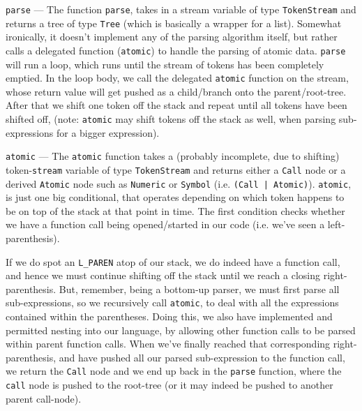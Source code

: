 \documentclass{article}
\newcommand{\code}[1]{\texttt{#1}}
\begin{document}
      \code{parse} --- The function \code{parse}, takes in a stream variable of
      type \code{TokenStream} and returns a tree of type \code{Tree} (which is
      basically a wrapper for a list).  Somewhat ironically, it doesn't implement
      any of the parsing algorithm itself, but rather calls a delegated
      function (\code{atomic}) to handle the parsing of atomic data. \code{parse}
      will run a loop, which runs until the stream of tokens has been completely
      emptied. In the loop body, we call the delegated \code{atomic} function on
      the stream, whose return value will get pushed as a child/branch onto the
      parent/root-tree. After that we shift one token off the stack and repeat
      until all tokens have been shifted off, (note: \code{atomic} may shift
      tokens off the stack as well, when parsing sub-expressions for a bigger
      expression).

      \code{atomic} --- The \code{atomic} function takes a (probably incomplete,
      due to shifting) token-\code{stream} variable of
      type \code{TokenStream} and returns either a \code{Call} node or a derived
      \code{Atomic} node such as \code{Numeric} or \code{Symbol} (i.e.
      \code{(Call | Atomic)}). \code{atomic}, is just one big conditional, that
      operates depending on which token happens to be on top of the stack at that
      point in time.  The first condition checks whether we have a function call
      being opened/started in our code (i.e. we've seen a left-parenthesis).

      \begin{adjustwidth}{1cm}{}
      \indent \indent If we do spot an \code{L\_PAREN}
      atop of our stack, we do indeed have a function call,
      and hence we must continue shifting off the stack until we reach a closing
      right-parenthesis.  But, remember, being a bottom-up parser, we must first
      parse all sub-expressions, so we recursively call \code{atomic}, to deal
      with all the expressions contained within the parentheses. Doing this, we
      also have implemented and permitted nesting into our language, by allowing
      other function calls to be parsed within parent function calls. When we've
      finally reached that corresponding right-parenthesis, and have pushed all
      our parsed sub-expression to the function call, we return the \code{Call}
      node and we end up back in the \code{parse} function, where the \code{call}
      node is pushed to the root-tree (or it may indeed be pushed to another
      parent call-node).
      \end{adjustwidth}
\end{document}
